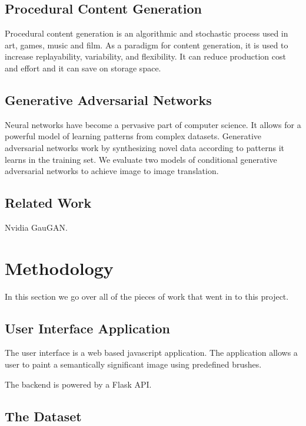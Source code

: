 \documentclass[twocolumn]{article}
\begin{document}
	\subsection{Procedural Content Generation}
	
	Procedural content generation is an algorithmic and stochastic process used in art, games, music and film. As a paradigm for content generation, it is used to increase replayability, variability, and flexibility. It can reduce production cost and effort and it can save on storage space.

	\subsection{Generative Adversarial Networks}
	
	Neural networks have become a pervasive part of computer science. It allows for a powerful model of learning patterns from complex datasets. Generative adversarial networks work by synthesizing novel data according to patterns it learns in the training set. We evaluate two models of conditional generative adversarial networks to achieve image to image translation.

	\subsection{Related Work}

	Nvidia GauGAN. 	
	
	\section{Methodology}
	
	In this section we go over all of the pieces of work that went in to this project.
	
	\subsection{User Interface Application}
	
	The user interface is a web based javascript application. The application allows a user to paint a semantically significant image using predefined brushes.
	
	The backend is powered by a Flask API.
	
	\subsection{The Dataset}
\end{document}
